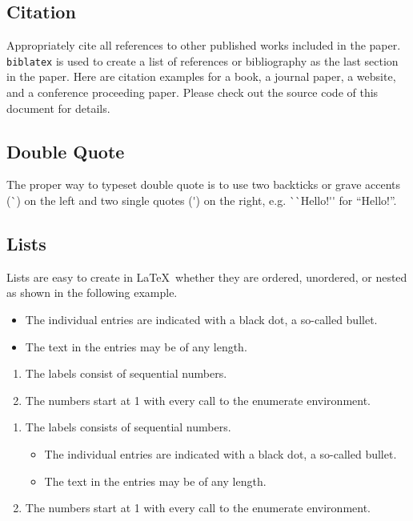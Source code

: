 \documentclass[article,twoside]{combine}
\begin{document}
\subsection{Citation}
Appropriately cite all references to other published works included in the paper.
\texttt{biblatex} is used to create a list of references or bibliography as the
last section in the paper. Here are citation examples for a
book\cite{latexcompanion}, a journal paper\cite{einstein}, a
website\cite{knuthwebsite}, and a conference proceeding paper\cite{maurer}.
Please check out the source code of this document for details.

\subsection{Double Quote}
The proper way to typeset double quote is to use two backticks or grave accents
(\`{}) on the left and two single quotes (\'{}) on the right, e.g.
\`{}\`{}Hello!\'{}\'{} for ``Hello!''.

\subsection{Lists}
Lists are easy to create in  \LaTeX\ whether they are ordered, unordered, or
nested as shown in the following example.

\begin{itemize}[noitemsep]
  \item The individual entries are indicated with a black dot, a so-called bullet.
  \item The text in the entries may be of any length.
\end{itemize}

\begin{enumerate}[noitemsep]
  \item The labels consist of sequential numbers.
  \item The numbers start at 1 with every call to the enumerate environment.
\end{enumerate}

\begin{enumerate}[noitemsep]
   \item The labels consists of sequential numbers.
   \begin{itemize}[noitemsep]
     \item The individual entries are indicated with a black dot, a so-called bullet.
     \item The text in the entries may be of any length.
   \end{itemize}
   \item The numbers start at 1 with every call to the enumerate environment.
\end{enumerate}
\end{document}
